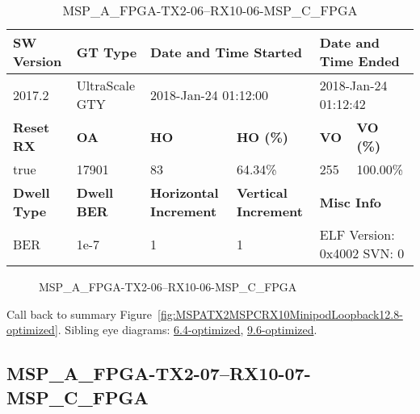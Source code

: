 \begin{table}[h]
\centering
\caption{MSP\_A\_FPGA-TX2-06--RX10-06-MSP\_C\_FPGA}
\label{tab:MSPAFPGATX206RX1006MSPCFPGA12.8-optimized}
\begin{tabular}{@{}|l|l|l|l|l|l|@{}}
\toprule
\textbf{SW Version}                & \textbf{GT Type}   & \multicolumn{2}{l|}{\textbf{Date and Time Started}}            & \multicolumn{2}{l|}{\textbf{Date and Time Ended}}        \\ \midrule
2017.2                       & UltraScale GTY          & \multicolumn{2}{l|}{2018-Jan-24 01:12:00}                   & \multicolumn{2}{l|}{2018-Jan-24 01:12:42}               \\ \midrule
\textbf{Reset RX}                  & \textbf{OA} & \textbf{HO}   & \textbf{HO (\%)} & \textbf{VO} & \textbf{VO (\%)} \\ \midrule
true & 17901        & 83          & 64.34\%        & 255        & 100.00\%       \\ \midrule
\textbf{Dwell Type}                & \textbf{Dwell BER} & \textbf{Horizontal Increment} & \textbf{Vertical Increment}    & \multicolumn{2}{l|}{\textbf{Misc Info}}                  \\ \midrule
BER                            & 1e-7        & 1        & 1           & \multicolumn{2}{l|}{ELF Version: 0x4002 SVN: 0}                         \\ \bottomrule
\end{tabular}
\end{table}

\begin{figure}[h]
\caption{MSP\_A\_FPGA-TX2-06--RX10-06-MSP\_C\_FPGA} \label{fig:MSPAFPGATX206RX1006MSPCFPGA12.8-optimized}
\end{figure}

Call back to summary Figure~\ref{fig:MSPATX2MSPCRX10MinipodLoopback12.8-optimized}.
Sibling eye diagrams: \hyperref[sec:MSPAFPGATX206RX1006MSPCFPGA6.4-optimized]{6.4-optimized}, \hyperref[sec:MSPAFPGATX206RX1006MSPCFPGA9.6-optimized]{9.6-optimized}.

\clearpage
\newpage


\subsection{MSP\_A\_FPGA-TX2-07--RX10-07-MSP\_C\_FPGA}\label{sec:MSPAFPGATX207RX1007MSPCFPGA12.8-optimized}

